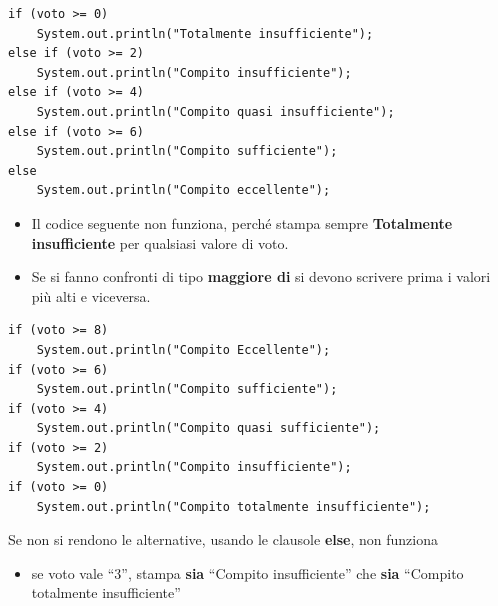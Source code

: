 \begin{frame}[fragile]
\begin{lstlisting}
if (voto >= 0)
    System.out.println("Totalmente insufficiente");
else if (voto >= 2)
    System.out.println("Compito insufficiente");
else if (voto >= 4)
    System.out.println("Compito quasi insufficiente");
else if (voto >= 6)
    System.out.println("Compito sufficiente");
else
    System.out.println("Compito eccellente");
\end{lstlisting}
\pause
\begin{block}{}
\begin{itemize}
\item Il codice seguente non funziona, perché stampa sempre \textbf{Totalmente insufficiente} per qualsiasi valore di voto. 
\item Se si fanno confronti di tipo \textbf{maggiore di} si devono scrivere prima i valori più alti e viceversa.
\end{itemize}
\end{block}
\end{frame}

\begin{frame}[fragile]
\begin{lstlisting}
if (voto >= 8)
    System.out.println("Compito Eccellente");
if (voto >= 6)
    System.out.println("Compito sufficiente");
if (voto >= 4)
    System.out.println("Compito quasi sufficiente");
if (voto >= 2)
    System.out.println("Compito insufficiente");
if (voto >= 0)
    System.out.println("Compito totalmente insufficiente");
\end{lstlisting}
\pause
\begin{block}{}
Se non si rendono \textbf{} le alternative, usando le clausole \textbf{else}, non funziona
\begin{itemize}
\item se voto vale ``3'', stampa \textbf{\alert{sia}} ``Compito insufficiente'' che \textbf{\alert{sia}} ``Compito totalmente 
insufficiente''
\end{itemize}
\end{block}
\end{frame}

